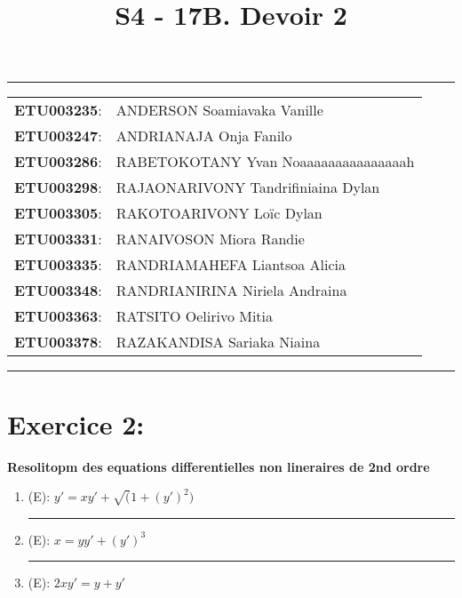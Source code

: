 \documentclass[a4paper,12pt]{article}
\begin{document}
	
\title{\textbf{S4 - 17B. Devoir 2}}
\date{}
\maketitle

\hrule
\vspace{1em}

\begin{tabular}{rl}
	\textbf{ETU003235}: & ANDERSON Soamiavaka Vanille \\
	\textbf{ETU003247}: & ANDRIANAJA Onja Fanilo \\
	\textbf{ETU003286}: & RABETOKOTANY Yvan Noaaaaaaaaaaaaaaah \\
	\textbf{ETU003298}: & RAJAONARIVONY Tandrifiniaina Dylan \\
	\textbf{ETU003305}: & RAKOTOARIVONY Loïc Dylan \\
	\textbf{ETU003331}: & RANAIVOSON Miora Randie \\
	\textbf{ETU003335}: & RANDRIAMAHEFA Liantsoa Alicia \\
	\textbf{ETU003348}: & RANDRIANIRINA Niriela Andraina \\
	\textbf{ETU003363}: & RATSITO Oelirivo Mitia \\
	\textbf{ETU003378}: & RAZAKANDISA Sariaka Niaina \\
\end{tabular}

\vspace{1em}
\hrule

\newpage
\section*{Exercice 2:}
\textbf{Resolitopm des equations differentielles non lineraires de 2nd ordre}

\begin{enumerate}
	\vspace{1cm}
	\item (E): $y' = xy' + \sqrt(1+(y')^2)$ \\
	
	
	\vspace{1cm}
	\hrule
	\vspace{1cm}

	\item (E): $x = yy' + (y')^3$ \\
	
	
	\vspace{1cm}
	\hrule
	\vspace{1cm}

	\item (E): $2xy' = y + y'$ \\
	
	\vspace{1cm}
	

\end{enumerate}
\end{document}
